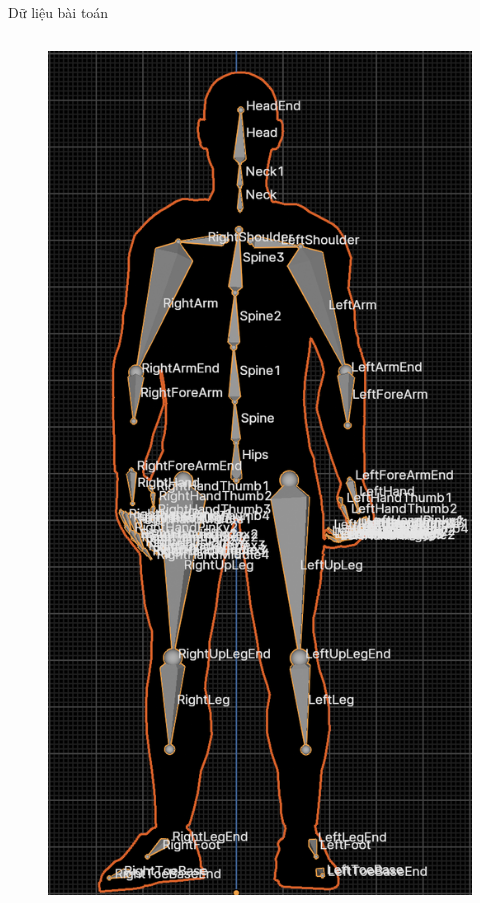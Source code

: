 \documentclass[10pt,mathserif]{beamer}
\begin{document}
\begin{frame}{Dữ liệu bài toán}
\begin{columns}
			\begin{column}{0.3\textwidth}
				\begin{figure}[h]
					\centering
					\includegraphics[width=\textwidth]{Skeleton}
				\end{figure}
		\end{column}
		
	\end{columns}
	
\end{frame}
\end{document}
